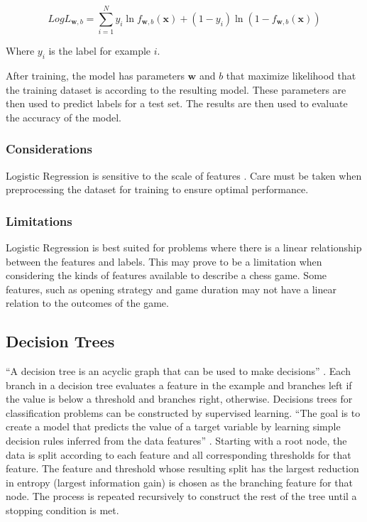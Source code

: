 \documentclass[12pt]{article}
\begin{document}
\[
LogL_{\textbf{w},b} =
\sum_{i=1}^N y_i\ln{f_{\textbf{w},b}(\textbf{x}) + (1-y_i)\ln(1 - f_{\textbf{w},b}(\textbf{x}))}
\]

\noindent Where $y_i$ is the label for example $i$.

\vspace{12pt}After training, the model has parameters $\textbf{w}$ and $b$ that maximize likelihood that the training dataset is according to the resulting model. These parameters are then used to predict labels for a test set. The results are then used to evaluate the accuracy of the model.

\subsubsection{Considerations}Logistic Regression is sensitive to the scale of features \cite{Alon1997}. Care must be taken when preprocessing the dataset for training to ensure optimal performance.

\subsubsection{Limitations}Logistic Regression is best suited for problems where there is a linear relationship between the features and labels. This may prove to be a limitation when considering the kinds of features available to describe a chess game. Some features, such as opening strategy and game duration may not have a linear relation to the outcomes of the game.

\subsection{Decision Trees}

``A decision tree is an acyclic graph that can be used to make decisions'' \cite[Chapter 3, Section 3.3]{100MLB}. Each branch in a decision tree evaluates a feature in the example and branches left if the value is below a threshold and branches right, otherwise. Decisions trees for classification problems can be constructed by supervised learning. ``The goal is to create a model that predicts the value of a target variable by learning simple decision rules inferred from the data features'' \cite{sklearnDT}. Starting with a root node, the data is split according to each feature and all corresponding thresholds for that feature. The feature and threshold whose resulting split has the largest reduction in entropy (largest information gain) is chosen as the branching feature for that node. The process is repeated recursively to construct the rest of the tree until a stopping condition is met.
\end{document}
